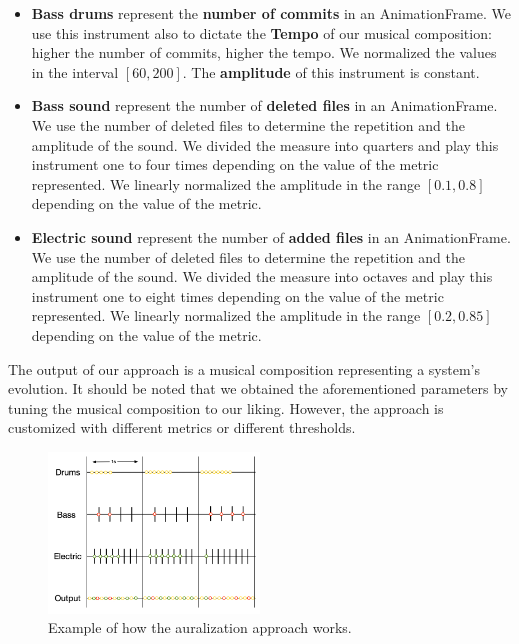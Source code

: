\begin{itemize}

    \item \textbf{Bass drums} represent the \textbf{number of commits} in an AnimationFrame. We use this instrument also to dictate the \textbf{Tempo} of our musical composition: higher the number of commits, higher the tempo. We normalized the values in the interval $\left[60,200\right]$. The \textbf{amplitude} of this instrument is constant.
    
    \item \textbf{Bass sound} represent the number of \textbf{deleted files} in an AnimationFrame. We use the number of deleted files to determine the repetition and the amplitude of the sound. We divided the measure into quarters and play this instrument one to four times depending on the value of the metric represented. We linearly normalized the amplitude in the range $\left[0.1,0.8\right]$ depending on the value of the metric.
    
    \item \textbf{Electric sound} represent the number of \textbf{added files} in an AnimationFrame. We use the number of deleted files to determine the repetition and the amplitude of the sound. We divided the measure into octaves and play this instrument one to eight times depending on the value of the metric represented. We linearly normalized the amplitude in the range $\left[0.2,0.85\right]$ depending on the value of the metric.

\end{itemize}

The output of our approach is a musical composition representing a system's evolution. It should be noted that we obtained the aforementioned parameters by tuning the musical composition to our liking. However, the approach is customized with different metrics or different thresholds. 


\begin{figure}
    \center
    \includegraphics[width=0.5\textwidth]{AuralizationApproach.jpg}
    \caption{Example of how the auralization approach works. }
    \label{fig:ApproachArualization}
\end{figure}

